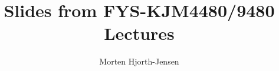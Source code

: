 \newcommand{\bigO}{\mathcal{O}}

\newcommand{\real}[1]{\mathrm{Re}\!\left\{#1\right\}}

\newcommand{\brab}[1]{\big\langle #1 \big|}
\newcommand{\brabb}[1]{\Big\langle #1 \Big|}
\newcommand{\brabbb}[1]{\bigg\langle #1 \bigg|}
\newcommand{\brabbbb}[1]{\Bigg\langle #1 \Bigg|}
\newcommand{\ketb}[1]{\big| #1 \big\rangle}
\newcommand{\ketbb}[1]{\Big| #1 \Big\rangle}
\newcommand{\ketbbb}[1]{\bigg| #1 \bigg\rangle}
\newcommand{\ketbbbb}[1]{\Bigg| #1 \Bigg\rangle}
\newcommand{\overlapb}[2]{\big\langle #1 \big| #2 \big\rangle}
\newcommand{\overlapbb}[2]{\Big\langle #1 \Big| #2 \Big\rangle}
\newcommand{\overlapbbb}[2]{\bigg\langle #1 \bigg| #2 \bigg\rangle}
\newcommand{\overlapbbbb}[2]{\Bigg\langle #1 \Bigg| #2 \Bigg\rangle}
\newcommand{\bracket}[3]{\langle #1 | #2 | #3 \rangle}
\newcommand{\bracketb}[3]{\big\langle #1 \big| #2 \big| #3 \big\rangle}
\newcommand{\bracketbb}[3]{\Big\langle #1 \Big| #2 \Big| #3 \Big\rangle}
\newcommand{\bracketbbb}[3]{\bigg\langle #1 \bigg| #2 \bigg| #3 \bigg\rangle}
\newcommand{\bracketbbbb}[3]{\Bigg\langle #1 \Bigg| #2 \Bigg| #3 \Bigg\rangle}
\newcommand{\projection}[2]
{| #1 \rangle \langle  #2 |}
\newcommand{\projectionb}[2]
{\big| #1 \big\rangle \big\langle #2 \big|}
\newcommand{\projectionbb}[2]
{ \Big| #1 \Big\rangle \Big\langle #2 \Big|}
\newcommand{\projectionbbb}[2]
{ \bigg| #1 \bigg\rangle \bigg\langle #2 \bigg|}
\newcommand{\projectionbbbb}[2]
{ \Bigg| #1 \Bigg\rangle \Bigg\langle #2 \Bigg|}


\newcommand{\Feta}{\hspace{0.6ex}\begin{turn}{180}
        {\raisebox{-\height}{\parbox[c]{1mm}{F}}}\end{turn}}
\newcommand{\feta}{\hspace{-1.6ex}\begin{turn}{180}
        {\raisebox{-\height}{\parbox[b]{4mm}{f}}}\end{turn}}




\title[FYS-KJM4480]{Slides from FYS-KJM4480/9480 Lectures}
\author[Quantum mechanics of many-particle systems]{%
  Morten Hjorth-Jensen}

